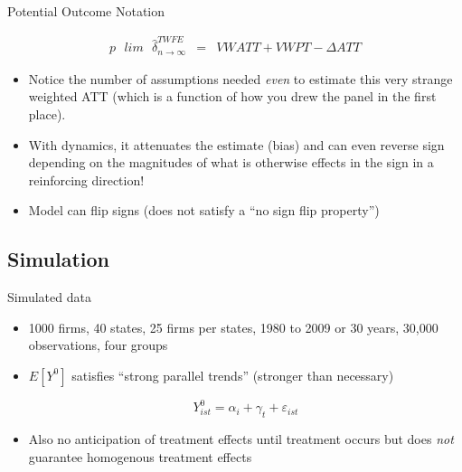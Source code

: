 \documentclass{beamer}
\begin{document}
\begin{frame}{Potential Outcome Notation}

\begin{eqnarray*}
p\text{ }lim\text{ } \widehat{\delta}^{TWFE}_{n\to\infty} &=& VWATT + VWPT - \Delta ATT
\end{eqnarray*}

\begin{itemize}
\item Notice the number of assumptions needed \emph{even} to estimate this very strange weighted ATT (which is a function of how you drew the panel in the first place). 
\item With dynamics, it attenuates the estimate (bias) and can even reverse sign depending on the magnitudes of what is otherwise effects in the sign in a reinforcing direction! 
\item Model can flip signs (does not satisfy a ``no sign flip property'')
\end{itemize}

\end{frame}



\subsection{Simulation}

\begin{frame}{Simulated data}

\begin{itemize}
\item 1000 firms, 40 states, 25 firms per states, 1980 to 2009 or 30 years, 30,000 observations, four groups
\item $E[Y^0]$ satisfies ``strong parallel trends''  (stronger than necessary)

$$Y^0_{ist} = \alpha_i + \gamma_t + \varepsilon_{ist}$$

\item Also no anticipation of treatment effects until treatment occurs but does \emph{not} guarantee homogenous treatment effects
\end{itemize}
\end{frame}
\end{document}
